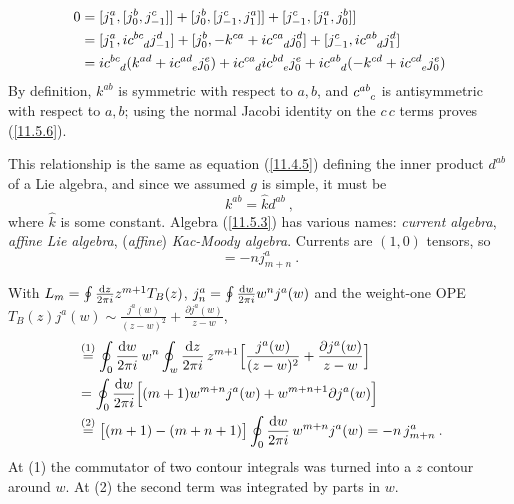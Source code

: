\begin{tcolorbox}[breakable]
	\begin{align*}
		0 &= [j_{1}^{a},[j_{0}^{b},j_{-1}^{c}]]+[j_{0}^{b},[j_{-1}^{c},j_{1}^{a}]]
		+[j_{-1}^{c},[j_{1}^{a},j_{0}^{b}]] \\
		&= [j_{1}^{a},\mi c\indices{^b^c_d}j^{d}_{-1}]+ [j_{0}^{b},-k^{ca}+\mi c\indices{^c^a_d}j_{0}^{d}]
		+[j_{-1}^{c},\mi c\indices{^a^b_d}j_{1}^{d}]\\
		&=\mi c\indices{^b^c_d}(k^{ad}+\mi c\indices{^a^d_e}j^{e}_{0})+\mi c\indices{^c^a_d}\mi c\indices{^b^d_e}j^{e}_{0}
		+\mi c\indices{^a^b_d}(-k^{cd}+\mi c\indices{^c^d_e}j^{e}_{0})
	\end{align*}
	By definition, $k^{ab}$ is symmetric with respect to $a,b$, and $c\indices{^a^b_c}$ is antisymmetric with respect to $a,b$; using the normal Jacobi identity on the $c\,c$ terms proves (\ref{11.5.6}).
\end{tcolorbox}
\noindent This relationship is the same as equation (\ref{11.4.5}) defining the inner product $d^{ab}$ of a Lie algebra, and since we assumed $g$ is simple, it must be
\begin{equation}
	k^{ab}=\hat{k}d^{ab} \:, \label{11.5.7}
\end{equation}
where $\hat{k}$ is some constant. Algebra (\ref{11.5.3}) has various names: \emph{current algebra}, \emph{affine Lie algebra}, (\emph{affine}) \emph{Kac-Moody algebra}. Currents are $(1,0)$ tensors, so
\begin{equation}
	[L_{m},j_{n}^{a}] = -nj_{m+n}^{a} \:. \label{11.5.8}
\end{equation}
\begin{tcolorbox}[breakable]
	\begin{remark}
		With $L_{m}=\oint\frac{\mathrm{d} z}{2\pi i}z^{m+1}T_{B}(z)$, $j^{a}_{n}=\oint\frac{\mathrm{d} w}{2\pi i}w^{n}j^{a}(w)$ and the weight-one OPE $T_{B}(z)j^{a}(w)\sim\frac{j^{a}(w)}{(z-w)^{2}}+\frac{\partial j^{a}(w)}{z-w}$,
		\begin{align*}
			[L_{m},j^{a}_{n}]&\eqs{1}\oint_{0}\frac{\dif w}{2\pi\mi}\,w^{n}\oint_{w}\frac{\dif z}{2\pi\mi}\,z^{m+1}\Bigl[\frac{j^{a}(w)}{(z-w)^{2}}+\frac{\partial j^{a}(w)}{z-w}\Bigr]\\
			&=\oint_{0}\frac{\dif w}{2\pi\mi}\Bigl[(m+1)w^{m+n}j^{a}(w)+w^{m+n+1}\partial j^{a}(w)\Bigr]\\
			&\eqs{2}\bigl[(m+1)-(m+n+1)\bigr]\oint_{0}\frac{\dif w}{2\pi\mi}\,w^{m+n}j^{a}(w)=-n\,j^{a}_{m+n}\:.
		\end{align*}
		At (1) the commutator of two contour integrals was turned into a $z$ contour around $w$. At (2) the second term was integrated by parts in $w$.
	\end{remark}
\end{tcolorbox}

